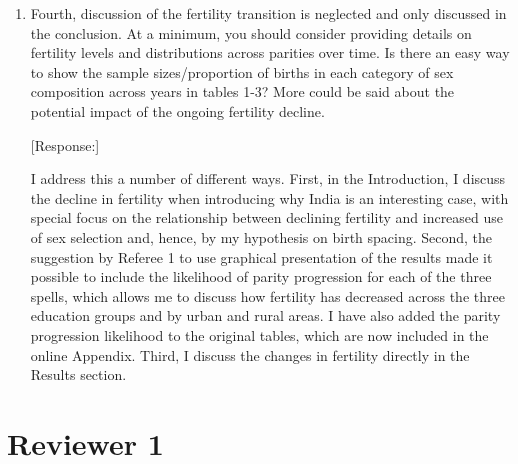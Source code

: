 \documentclass[letterpaper,12pt]{article}
\begin{document}
\begin{enumerate}
\item Fourth, discussion of the fertility transition is neglected and only
discussed in the conclusion. At a minimum, you should consider providing
details on fertility levels and distributions across parities over time.
Is there an easy way to show the sample sizes/proportion of births in
each category of sex composition across years in tables 1-3? More could
be said about the potential impact of the ongoing fertility decline.

[Response:]

I address this a number of different ways.
First, in the Introduction, I discuss the decline in fertility when introducing why India 
is an interesting case, with special focus on the relationship between declining fertility 
and increased use of sex selection and, hence, by my hypothesis on birth spacing.
Second, the suggestion by Referee 1 to use graphical presentation of the results made it 
possible to include the likelihood of parity progression for each of the three spells, 
which allows me to discuss how fertility has decreased across the three education groups
and by urban and rural areas.
I have also added the parity progression likelihood to the original tables, which are now
included in the online Appendix.
Third, I discuss the changes in fertility directly in the Results section. 


% 

\end{enumerate}

\newpage

\section*{Reviewer 1}
\end{document}
